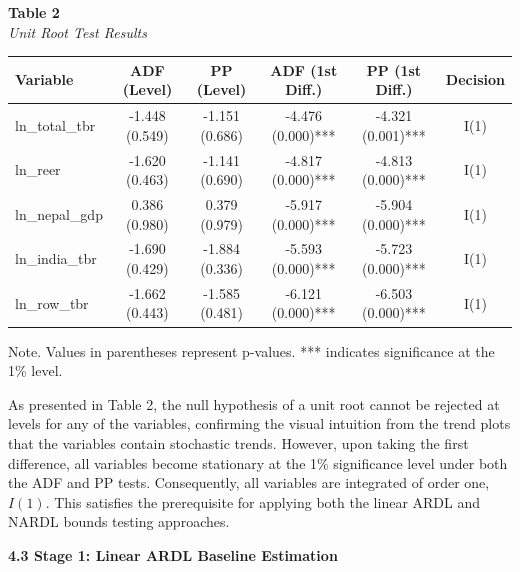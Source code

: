 \documentclass[12pt]{article}
\begin{document}
\begin{table}[htbp]
\raggedright

\textbf{Table 2}\\
\textit{Unit Root Test Results}

\vspace{0.2cm}

\begin{tabular}{lccccc}
\hline
Variable & ADF (Level) & PP (Level) & ADF (1st Diff.) & PP (1st Diff.) & Decision \\
\hline
ln\_total\_tbr 
& -1.448 (0.549) 
& -1.151 (0.686) 
& -4.476 (0.000)*** 
& -4.321 (0.001)*** 
& I(1) \\

ln\_reer 
& -1.620 (0.463) 
& -1.141 (0.690) 
& -4.817 (0.000)*** 
& -4.813 (0.000)*** 
& I(1) \\

ln\_nepal\_gdp 
& 0.386 (0.980) 
& 0.379 (0.979) 
& -5.917 (0.000)*** 
& -5.904 (0.000)*** 
& I(1) \\

ln\_india\_tbr 
& -1.690 (0.429) 
& -1.884 (0.336) 
& -5.593 (0.000)*** 
& -5.723 (0.000)*** 
& I(1) \\

ln\_row\_tbr 
& -1.662 (0.443) 
& -1.585 (0.481) 
& -6.121 (0.000)*** 
& -6.503 (0.000)*** 
& I(1) \\

\hline
\end{tabular}

\vspace{0.2cm}

\raggedright
\footnotesize
Note. Values in parentheses represent p-values. *** indicates significance at the 1\% level.

\end{table}

As presented in Table 2, the null hypothesis of a unit root cannot be rejected at levels for any of the variables, confirming the visual intuition from the trend plots that the variables contain stochastic trends. However, upon taking the first difference, all variables become stationary at the 1\% significance level under both the ADF and PP tests. Consequently, all variables are integrated of order one, $I(1)$. This satisfies the prerequisite for applying both the linear ARDL and NARDL bounds testing approaches.

\vspace{0.5cm}
\noindent\textbf{4.3 Stage 1: Linear ARDL Baseline Estimation}
\end{document}
